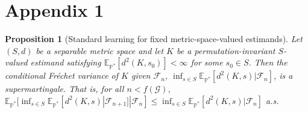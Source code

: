 \documentclass{article}
\newtheorem{prop}{Proposition}
\begin{document}
\section{Appendix 1}
\begin{prop}[Standard learning for fixed metric-space-valued estimands]
\label{metricstandardlearning}
Let $(S,d)$ be a separable metric space and let $K$ be a permutation-invariant $S$-valued estimand satisfying $\mathbb{E}_{\mathbb{P}^*}[d^2(K,s_0)]<\infty$ for some $s_0 \in S$. Then the conditional Fr\'{e}chet variance of $K$ given $\mathcal{F}_n$, $\inf_{s \in S} \mathbb{E}_{\mathbb{P}^*}[d^2(K,s)|\mathcal{F}_n]$, is a supermartingale. That is, for all $n < f(\mathcal{G})$, $\mathbb{E}_{\mathbb{P}^*}[\inf_{s \in S} \mathbb{E}_{\mathbb{P}^*}[d^2(K,s)|\mathcal{F}_{n+1}]|\mathcal{F}_n] \leq \inf_{s \in S} \mathbb{E}_{\mathbb{P}^*}[d^2(K,s)|\mathcal{F}_n]$ a.s.
\end{prop}
\end{document}
